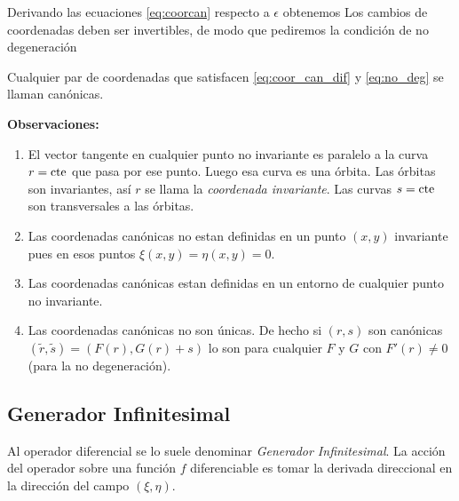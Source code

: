 Derivando las ecuaciones \eqref{eq:coorcan} respecto a $\epsilon$ obtenemos
 Los cambios de coordenadas deben ser invertibles, de modo que pediremos la condición de no degeneración

\begin{definicion}
Cualquier par de coordenadas que satisfacen \eqref{eq:coor_can_dif} y \eqref{eq:no_deg} se llaman canónicas.
\end{definicion}




\noindent\textbf{Observaciones:}
\begin{enumerate}
\item El vector tangente en cualquier punto no invariante es paralelo a la curva $r=\hbox{cte}$ que pasa por ese punto. Luego esa curva es una órbita. Las órbitas son invariantes, así  $r$ se llama la \emph{coordenada invariante}. Las curvas $s=\hbox{cte}$ son transversales a las órbitas.
\item Las coordenadas canónicas no estan definidas en un punto $(x,y)$ invariante pues en esos puntos $\xi(x,y)=\eta(x,y)=0$.

\item Las coordenadas canónicas estan definidas en un entorno de cualquier   punto no invariante.

\item Las coordenadas canónicas no son únicas. De hecho si $(r,s)$ son canónicas $(\tilde{r},\tilde{s})=(F(r),G(r)+s)$ lo son para cualquier $F$ y $G$ con $F'(r)\neq 0$ (para la no degeneración).

\end{enumerate}



\subsection{Generador Infinitesimal}

\begin{definicion}
Al operador diferencial
se lo suele denominar \emph{Generador Infinitesimal}. La acción del operador sobre una función $f$ diferenciable es tomar la derivada direccional en la dirección del campo $(\xi,\eta)$. 
\end{definicion}

